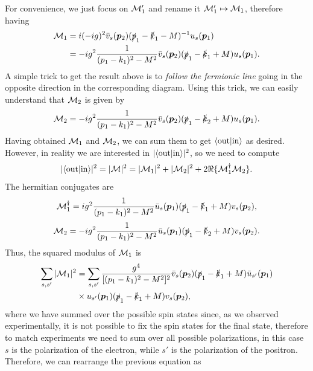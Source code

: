 For convenience, we just focus on $\mathcal{M}_1'$ and rename it $\mathcal{M}_1' \mapsto \mathcal{M}_1$, therefore having  
\begin{equation}
    \begin{split}
        \mathcal{M}_1 &= i(-ig)^2\bar{v}_s(\bm{p}_2)(\slashed{p}_1 - \slashed{k}_1 - M)^{-1}u_s(\bm{p}_1) \\
        &= -ig^2\frac{1}{(p_1 - k_1)^2 - M^2}\bar{v}_s(\bm{p}_2)(\slashed{p}_1 - \slashed{k}_1 + M)u_s(\bm{p}_1).
    \end{split}
\end{equation}
A simple trick to get the result above is to \emph{follow the fermionic line} going in the opposite direction in the corresponding diagram. Using this trick, we can easily understand that $\mathcal{M}_2$ is given by 
\begin{equation}
    \mathcal{M}_2 = -ig^2\frac{1}{(p_1 - k_1)^2 - M^2}\bar{v}_s(\bm{p}_2)(\slashed{p}_1 - \slashed{k}_2 + M)u_s(\bm{p}_1).
\end{equation}
Having obtained $\mathcal{M}_1$ and $\mathcal{M}_2$, we can sum them to get $\langle \mathrm{out} | \mathrm{in} \rangle$ as desired. However, in reality we are interested in $|\langle \mathrm{out} | \mathrm{in} \rangle|^2$, so we need to compute 
\begin{equation}
    |\langle \mathrm{out} | \mathrm{in} \rangle|^2 = |\mathcal{M}|^2 = |\mathcal{M}_1|^2 + |\mathcal{M}_2|^2 + 2\Re{\{\mathcal{M}_1^\dagger\mathcal{M}_2\}}.
\end{equation}
The hermitian conjugates are 
\begin{equation}
    \mathcal{M}_1^\dagger = ig^2\frac{1}{(p_1 - k_1)^2 - M^2}\bar{u}_s(\bm{p}_1)(\slashed{p}_1 - \slashed{k}_1 + M)v_s(\bm{p}_2),
\end{equation}
\begin{equation}
    \mathcal{M}_2 = -ig^2\frac{1}{(p_1 - k_1)^2 - M^2}\bar{u}_s(\bm{p}_1)(\slashed{p}_1 - \slashed{k}_2 + M)v_s(\bm{p}_2).
\end{equation}
Thus, the squared modulus of $\mathcal{M}_1$ is
\begin{equation}
    \begin{split}
         \sum_{s,s'}|\mathcal{M}_1|^2 &= \sum_{s,s'}\frac{g^4}{[(p_1 - k_1)^2 - M^2]^2}\bar{v}_s(\bm{p}_2)(\slashed{p}_1 - \slashed{k}_1 + M)\bar{u}_{s'}(\bm{p}_1) \\
        &\times u_{s'}(\bm{p}_1)(\slashed{p}_1 - \slashed{k}_1 + M)v_s(\bm{p}_2),
    \end{split}
\end{equation}
where we have summed over the possible spin states since, as we observed experimentally, it is not possible to fix the spin states for the final state, therefore to match experiments we need to sum over all possible polarizations, in this case $s$ is the polarization of the electron, while $s'$ is the polarization of the positron. Therefore, we can rearrange the previous equation as 
